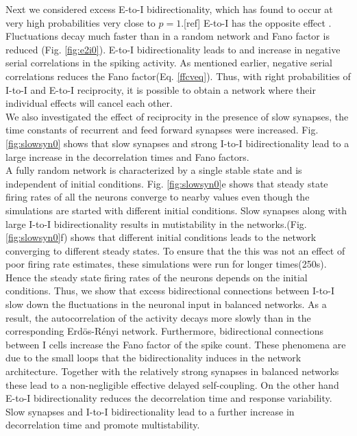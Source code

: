 Next we considered excess E-to-I bidirectionality, which has found to occur at very high probabilities very close to $p=1$.[ref] %
E-to-I has the opposite effect	. Fluctuations decay much faster than in a random network and Fano factor is reduced (Fig. \ref{fig:e2i0}). E-to-I bidirectionality leads to and increase in negative serial correlations in the spiking activity. As mentioned earlier, negative serial correlations reduces the Fano factor(Eq. \ref{ffcveq}). Thus,  with right probabilities of I-to-I and E-to-I reciprocity, it is possible to obtain a network where their individual effects will cancel each other. \\
We also investigated the effect of reciprocity in the presence of slow synapses, the time constants of recurrent and feed forward synapses were increased. Fig. \ref{fig:slowsyn0} shows that slow synapses and strong I-to-I bidirectionality lead to a large increase in the decorrelation times and Fano factors.\\  A fully random network is characterized by a single stable state and is independent of initial conditions. Fig. \ref{fig:slowsyn0}e shows that steady state firing rates of all the neurons converge to nearby values even though the simulations are started with different initial conditions. Slow synapses along with large I-to-I bidirectionality results in mutistability in the networks.(Fig. \ref{fig:slowsyn0}f) shows that different initial conditions leads to the network converging to different steady states. To ensure that the this was not an effect of poor firing rate estimates, these simulations were run for longer times(250s). Hence the steady state firing rates of the neurons depends on the initial conditions.
Thus, we show that excess bidirectional connections between I-to-I slow down the fluctuations in the neuronal input in balanced networks. As a result, the autocorrelation of the activity decays more slowly than in the corresponding Erdös-Rényi network. Furthermore, bidirectional connections between I cells increase the Fano factor of the spike count. These phenomena are due to the small loops that the bidirectionality induces in the network architecture. Together with the relatively strong synapses in balanced networks these lead to a non-negligible effective delayed self-coupling. On the other hand E-to-I bidirectionality reduces the decorrelation time and response variability. Slow synapses and I-to-I bidirectionality lead to a further increase in decorrelation time and promote multistability.


